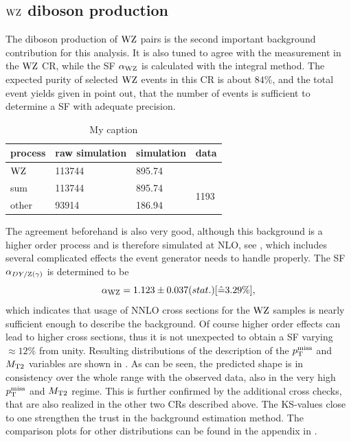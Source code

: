 \subsection{$\mathrm{W}\mathrm{Z}$ diboson production}
The diboson production of $\mathrm{W}\mathrm{Z}$ pairs is the second important background contribution for this analysis. It is also tuned to agree with the measurement in the $\mathrm{W}\mathrm{Z}$ CR, while the SF $\alpha_{\mathrm{W}\mathrm{Z}}$ is calculated with the integral method. The expected purity of selected $\mathrm{W}\mathrm{Z}$ events in this CR is about $84\%$, and the total event yields given in  point out, that the number of events is sufficient to determine a SF with adequate precision.
\begin{table}[tbp]
 \centering
 \caption{My caption}
 \label{tab:CRWZ}
 \begin{tabular}{llll}
  process  & raw simulation & simulation & data                  \\\hline
  $\mathrm{W}\mathrm{Z}$ & 113744         & 895.74     &                       \\\hline\hline
  sum      & 113744         & 895.74     & \multirow{2}{*}{1193} \\
  other    & 93914          & 186.94     &                       
 \end{tabular}
\end{table}
The agreement beforehand is also very good, although this background is a higher order process and is therefore simulated at NLO, see , which includes several complicated effects the event generator needs to handle properly. The SF $\alpha_{DY/\mathrm{Z}(\gamma)}$ is determined to be
\begin{equation}\label{eq:AlphaWZ}
 \alpha_{\mathrm{W}\mathrm{Z}}=1.123 \pm 0.037 (stat.) [\hat{=}3.29\%],
\end{equation}
which indicates that usage of NNLO cross sections for the $\mathrm{W}\mathrm{Z}$ samples is nearly sufficient enough to describe the background. Of course higher order effects can lead to higher cross sections, thus it is not unexpected to obtain a SF varying $\approx12\%$ from unity. Resulting distributions of the description of the $p_{\mathrm{T}}^\text{miss}$ and $M_{\mathrm{T2}}$ variables are shown in . As can be seen, the predicted shape is in consistency over the whole range with the observed data, also in the very high $p_{\mathrm{T}}^\text{miss}$ and $M_{\mathrm{T2}}$ regime. This is further confirmed by the additional cross checks, that are also realized in the other two CRs described above. The KS-values close to one strengthen the trust in the background estimation method. The comparison plots for other distributions can be found in the appendix in .

